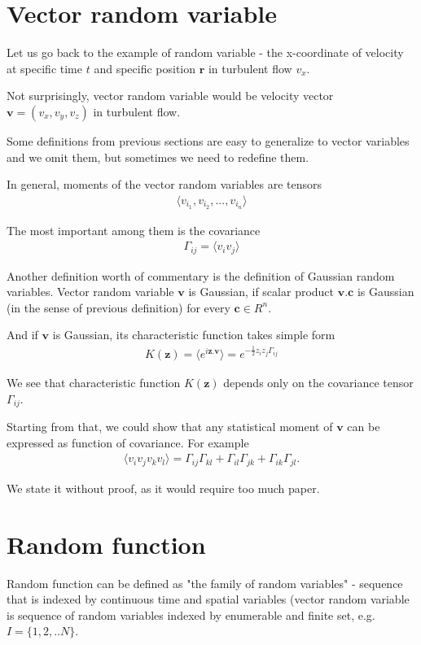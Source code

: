 \section{Vector random variable}
Let us go back to the example of random variable - the x-coordinate of velocity at specific time $t$ and specific position $\bm{r}$ in turbulent flow $v_x$.

Not surprisingly, vector random variable would be velocity vector $\bm{v} = (v_x,v_y,v_z)$ in turbulent flow.

Some definitions from previous sections are easy to generalize to vector variables and we omit them, but sometimes we need to redefine them.

In general, moments of the vector random variables are tensors
\begin{align}
\langle v_{i_1}, v_{i_2}, ..., v_{i_n} \rangle
\end{align}

The most important among them is the covariance
\begin{align}
\Gamma_{ij} = \langle v_i v_j \rangle
\end{align}

\bigskip
Another definition worth of commentary is the definition of Gaussian random variables.
Vector random variable $\bm{v}$ is Gaussian, if scalar product $\bm{v}.\bm{c}$ is Gaussian (in the sense of previous definition) for every $\bm{c} \in R^n$.

And if $\bm{v}$ is Gaussian, its characteristic function takes simple form
\begin{align}
K(\bm{z}) = \langle e^{i\bm{z}.\bm{v}} \rangle = e^{-\frac{1}{2} z_i z_j \Gamma_{ij}}
\end{align}

We see that characteristic function $K(\bm{z})$ depends only on the covariance tensor $\Gamma_{ij}$.

\bigskip


Starting from that, we could show that any statistical moment of $\bm{v}$ can be expressed as function of covariance. For example
\begin{align}
\langle v_i v_j v_k v_l \rangle = \Gamma_{ij}\Gamma_{kl} + \Gamma_{il}\Gamma_{jk} + \Gamma_{ik}\Gamma_{jl}.
\end{align}

We state it without proof, as it would require too much paper.

\section{Random function}
Random function can be defined as "the family of random variables" - sequence that is indexed by continuous time and spatial variables (vector random variable is sequence of random variables indexed by enumerable and finite set, e.g. $I=\big\{1,2,..N\big\}$.

